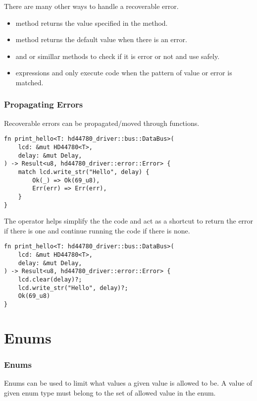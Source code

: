 \documentclass{beamer}
\begin{document}
\begin{frame}
There are many other ways to handle a recoverable error.
\begin{itemize}
  \item{ method returns the value specified in the method.}
  \item{ method returns the default value when there is an error.}
  \item{ and  or simillar methods to check if it is error or not and use  safely.}
  \item{ expressions and only execute code when the pattern of value or error is matched.}
\end{itemize}
\end{frame}

\begin{frame}
  \frametitle{Propagating Errors}
  Recoverable errors can be propagated/moved through functions.

\begin{lstlisting}
fn print_hello<T: hd44780_driver::bus::DataBus>(
    lcd: &mut HD44780<T>,
    delay: &mut Delay,
) -> Result<u8, hd44780_driver::error::Error> {
    match lcd.write_str("Hello", delay) {
        Ok(_) => Ok(69_u8),
        Err(err) => Err(err),
    }
}
\end{lstlisting}

  \pagebreak

  The  operator helps simplify the the code and act as a shortcut to return the error if there is one and continue running the code if there is none.

\begin{lstlisting}
fn print_hello<T: hd44780_driver::bus::DataBus>(
    lcd: &mut HD44780<T>,
    delay: &mut Delay,
) -> Result<u8, hd44780_driver::error::Error> {
    lcd.clear(delay)?;
    lcd.write_str("Hello", delay)?;
    Ok(69_u8)
}
\end{lstlisting}
\end{frame}

\section{Enums}
\begin{frame}[fragile]
  \frametitle{Enums}
  Enums can be used to limit what values a given value is allowed to be. A value of given enum type must belong to the set of allowed value in the enum.

  
\end{frame}
\end{document}
